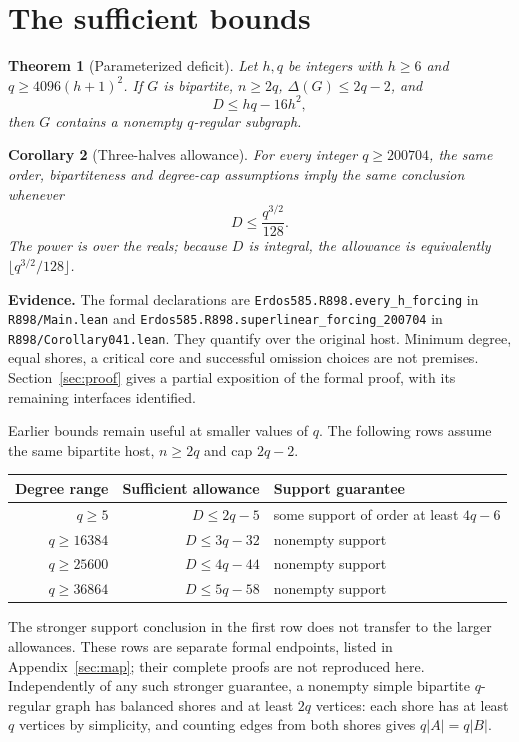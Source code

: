 \documentclass[11pt]{article}
\newtheorem{theorem}{Theorem}
\newtheorem{corollary}[theorem]{Corollary}
\newcommand{\status}[1]{\par\noindent\textcolor{blue!45!black}{\textbf{Evidence.} #1}\par}
\begin{document}
\section{The sufficient bounds}
\begin{theorem}[Parameterized deficit]\label{thm:param}
Let $h,q$ be integers with $h\ge6$ and $q\ge4096(h+1)^2$. If $G$ is bipartite, $n\ge2q$, $\Delta(G)\le2q-2$, and
\[
 D\le hq-16h^2,
\]
then $G$ contains a nonempty $q$-regular subgraph.
\end{theorem}
\begin{corollary}[Three-halves allowance]\label{thm:power}
For every integer $q\ge200704$, the same order, bipartiteness and degree-cap assumptions imply the same conclusion whenever
\[
 D\le\frac{q^{3/2}}{128}.
\]
The power is over the reals; because $D$ is integral, the allowance is equivalently $\lfloor q^{3/2}/128\rfloor$.
\end{corollary}
\status{The formal declarations are \nolinkurl{Erdos585.R898.every_h_forcing} in \nolinkurl{R898/Main.lean} and \nolinkurl{Erdos585.R898.superlinear_forcing_200704} in \nolinkurl{R898/Corollary041.lean}. They quantify over the original host. Minimum degree, equal shores, a critical core and successful omission choices are not premises. Section~\ref{sec:proof} gives a partial exposition of the formal proof, with its remaining interfaces identified.}

Earlier bounds remain useful at smaller values of $q$. The following rows assume the same bipartite host, $n\ge2q$ and cap $2q-2$.
\begin{center}
\begin{tabular}{rrl}
\toprule
Degree range & Sufficient allowance & Support guarantee\\
\midrule
$q\ge5$ & $D\le2q-5$ & some support of order at least $4q-6$\\
$q\ge16384$ & $D\le3q-32$ & nonempty support\\
$q\ge25600$ & $D\le4q-44$ & nonempty support\\
$q\ge36864$ & $D\le5q-58$ & nonempty support\\
\bottomrule
\end{tabular}
\end{center}
The stronger support conclusion in the first row does not transfer to the larger allowances. These rows are separate formal endpoints, listed in Appendix~\ref{sec:map}; their complete proofs are not reproduced here. Independently of any such stronger guarantee, a nonempty simple bipartite $q$-regular graph has balanced shores and at least $2q$ vertices: each shore has at least $q$ vertices by simplicity, and counting edges from both shores gives $q|A|=q|B|$.
\end{document}
